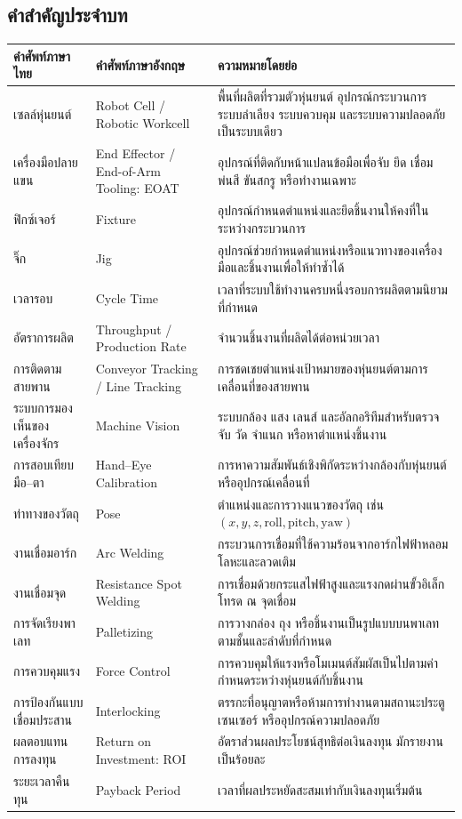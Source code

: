 \subsection{คำสำคัญประจำบท}

\begin{table}[htbp]
    \centering
    \small
    \begin{tabularx}{\textwidth}{L{0.18\textwidth} L{0.26\textwidth} Y}
        \hline
        \textbf{คำศัพท์ภาษาไทย} & \textbf{คำศัพท์ภาษาอังกฤษ} & \textbf{ความหมายโดยย่อ} \\
        \hline
        เซลล์หุ่นยนต์ & Robot Cell / Robotic Workcell & พื้นที่ผลิตที่รวมตัวหุ่นยนต์ อุปกรณ์กระบวนการ ระบบลำเลียง ระบบควบคุม และระบบความปลอดภัยเป็นระบบเดียว \\
        เครื่องมือปลายแขน & End Effector / End-of-Arm Tooling: EOAT & อุปกรณ์ที่ติดกับหน้าแปลนข้อมือเพื่อจับ ยึด เชื่อม พ่นสี ขันสกรู หรือทำงานเฉพาะ \\
        ฟิกซ์เจอร์ & Fixture & อุปกรณ์กำหนดตำแหน่งและยึดชิ้นงานให้คงที่ในระหว่างกระบวนการ \\
        จิ๊ก & Jig & อุปกรณ์ช่วยกำหนดตำแหน่งหรือแนวทางของเครื่องมือและชิ้นงานเพื่อให้ทำซ้ำได้ \\
        เวลารอบ & Cycle Time & เวลาที่ระบบใช้ทำงานครบหนึ่งรอบการผลิตตามนิยามที่กำหนด \\
        อัตราการผลิต & Throughput / Production Rate & จำนวนชิ้นงานที่ผลิตได้ต่อหน่วยเวลา \\
        การติดตามสายพาน & Conveyor Tracking / Line Tracking & การชดเชยตำแหน่งเป้าหมายของหุ่นยนต์ตามการเคลื่อนที่ของสายพาน \\
        ระบบการมองเห็นของเครื่องจักร & Machine Vision & ระบบกล้อง แสง เลนส์ และอัลกอริทึมสำหรับตรวจจับ วัด จำแนก หรือหาตำแหน่งชิ้นงาน \\
        การสอบเทียบมือ–ตา & Hand–Eye Calibration & การหาความสัมพันธ์เชิงพิกัดระหว่างกล้องกับหุ่นยนต์หรืออุปกรณ์เคลื่อนที่ \\
        ท่าทางของวัตถุ & Pose & ตำแหน่งและการวางแนวของวัตถุ เช่น $(x,y,z,\text{roll},\text{pitch},\text{yaw})$ \\
        งานเชื่อมอาร์ก & Arc Welding & กระบวนการเชื่อมที่ใช้ความร้อนจากอาร์กไฟฟ้าหลอมโลหะและลวดเติม \\
        งานเชื่อมจุด & Resistance Spot Welding & การเชื่อมด้วยกระแสไฟฟ้าสูงและแรงกดผ่านขั้วอิเล็กโทรด ณ จุดเชื่อม \\
        การจัดเรียงพาเลท & Palletizing & การวางกล่อง ถุง หรือชิ้นงานเป็นรูปแบบบนพาเลทตามชั้นและลำดับที่กำหนด \\
        การควบคุมแรง & Force Control & การควบคุมให้แรงหรือโมเมนต์สัมผัสเป็นไปตามค่ากำหนดระหว่างหุ่นยนต์กับชิ้นงาน \\
        การป้องกันแบบเชื่อมประสาน & Interlocking & ตรรกะที่อนุญาตหรือห้ามการทำงานตามสถานะประตู เซนเซอร์ หรืออุปกรณ์ความปลอดภัย \\
        ผลตอบแทนการลงทุน & Return on Investment: ROI & อัตราส่วนผลประโยชน์สุทธิต่อเงินลงทุน มักรายงานเป็นร้อยละ \\
        ระยะเวลาคืนทุน & Payback Period & เวลาที่ผลประหยัดสะสมเท่ากับเงินลงทุนเริ่มต้น \\
        \hline
    \end{tabularx}
\end{table}
